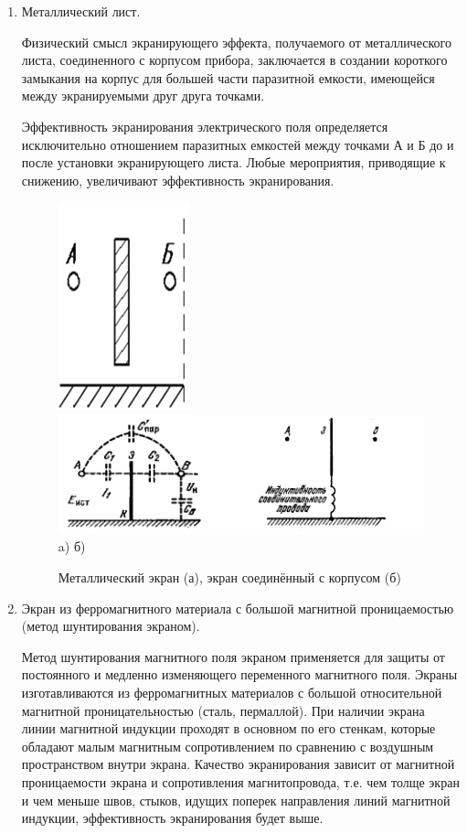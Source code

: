 \documentclass[unicode, 12pt, a4paper, oneside]{article}
\begin{document}
\begin{enumerate}
\item Металлический лист.

Физический смысл экранирующего эффекта, получаемого от металлического листа, соединенного с корпусом прибора, заключается в создании короткого замыкания на корпус для большей части паразитной емкости, имеющейся между экранируемыми друг друга точками.

Эффективность экранирования электрического поля  определяется исключительно отношением паразитных емкостей между точками А и Б до и после установки экранирующего листа. Любые мероприятия, приводящие к снижению, увеличивают эффективность экранирования.

\begin{figure}[H]
\centering
\hspace{0.15\textwidth}
\includegraphics[width=0.1\linewidth]{70_met_list.png}
\hspace{0.1\textwidth}
\includegraphics[width=0.6\linewidth]{70_met_eq.png}\\
a) \hspace{0.4\textwidth} б) \hspace{0.1\textwidth}
\caption{Металлический экран (а), экран соединённый с корпусом (б)}
\end{figure}


\item Экран из ферромагнитного материала с большой магнитной проницаемостью (метод шунтирования экраном).

Метод шунтирования магнитного поля экраном применяется для защиты от постоянного и медленно изменяющего переменного магнитного поля. Экраны изготавливаются из ферромагнитных материалов с большой относительной магнитной проницательностью (сталь, пермаллой). При наличии экрана линии магнитной индукции проходят в основном по его стенкам, которые обладают малым магнитным сопротивлением по сравнению с воздушным пространством внутри экрана.  Качество экранирования зависит от магнитной проницаемости экрана и сопротивления магнитопровода, т.е. чем толще экран и чем меньше швов, стыков, идущих поперек направления линий магнитной индукции, эффективность экранирования будет выше.


\end{enumerate}
\end{document}

